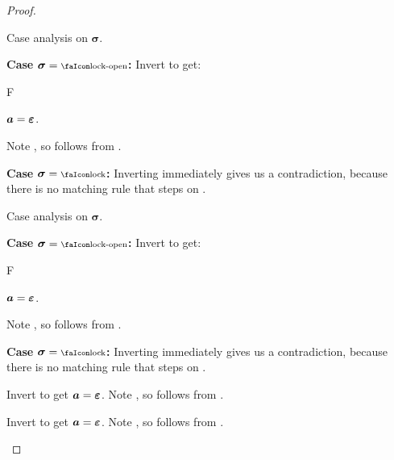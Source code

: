 \begin{proof}
\begin{description}
\begin{description}
          Case analysis on $\bm{\sigma}$.
          \begin{description}
            \item \textbf{Case }$\bm{\sigma}=\unlock$\textbf{:}
              Invert  to get:
              \begin{passumptions}{F}
                \item $\bm{a}=\bm{\varepsilon}$.
              \end{passumptions}
              Note , so  follows from .

            \item \textbf{Case }$\bm{\sigma}=\lock$\textbf{:}
              Inverting  immediately gives us a contradiction, because there is no matching rule that steps on \lock.
          \end{description}

          Case analysis on $\bm{\sigma}$.
          \begin{description}
            \item \textbf{Case }$\bm{\sigma}=\unlock$\textbf{:}
              Invert  to get:
              \begin{passumptions}{F}
                \item $\bm{a}=\bm{\varepsilon}$.
              \end{passumptions}
              Note , so  follows from .

            \item \textbf{Case }$\bm{\sigma}=\lock$\textbf{:}
              Inverting  immediately gives us a contradiction, because there is no matching rule that steps on \lock.
          \end{description}

          Invert  to get $\bm{a}=\bm{\varepsilon}$.
          Note , so  follows from .

          Invert  to get $\bm{a}=\bm{\varepsilon}$.
          Note , so  follows from .


\end{description}
\end{description}
\end{proof}
